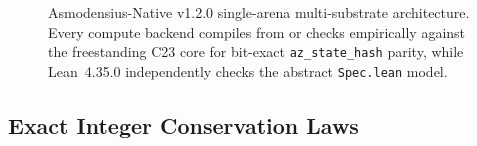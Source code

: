 \documentclass[11pt,reqno]{amsart}
\newcommand{\code}[1]{\texttt{\footnotesize #1}}
\newcommand{\us}{\_\allowbreak}
\begin{document}
\begin{figure}[htbp]
{%
}
\caption{Asmodensius-Native v1.2.0 single-arena multi-substrate architecture. Every compute backend compiles from or checks empirically against the freestanding C23 core for bit-exact \code{az\us state\us hash} parity, while Lean~4.35.0 independently checks the abstract \code{Spec.lean} model.}
\label{fig:architecture}
\end{figure}

\subsection{Exact Integer Conservation Laws}
\end{document}
